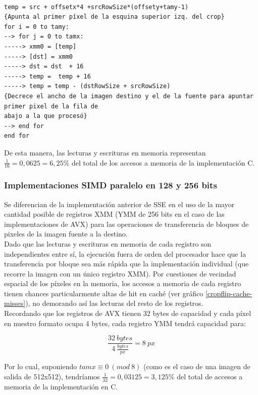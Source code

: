 \begin{codesnippet}
\begin{verbatim}

temp = src + offsetx*4 +srcRowSize*(offsety+tamy-1)       
{Apunta al primer píxel de la esquina superior izq. del crop}
for i = 0 to tamy:  
--> for j = 0 to tamx:  
-----> xmm0 = [temp]
-----> [dst] = xmm0 
-----> dst = dst  + 16 
-----> temp =  temp + 16 
-----> temp = temp - (dstRowSize + srcRowSize)       
{Decrece el ancho de la imagen destino y el de la fuente para apuntar primer pixel de la fila de
abajo a la que procesó}    
--> end for 
end for 

\end{verbatim}
\end{codesnippet}



De esta manera, las lecturas y escrituras en memoria representan $\frac{1}{16} = 0,0625 =  6,25\%$ del total de los accesos a memoria de la implementación C.


\subsubsection{Implementaciones SIMD paralelo en 128 y 256 bits}
Se diferencian de la implementación anterior de SSE en el uso de la mayor cantidad posible de registros XMM (YMM de 256 bits en el caso de las implementaciones de AVX) para las operaciones de transferencia de bloques de pixeles de la imagen fuente a la destino. 
\\

Dado que las lecturas y escrituras en memoria de cada registro son independientes entre sí, la ejecución fuera de orden del procesador hace que la transferencia por bloque sea más rápida que la implementación individual (que recorre la imagen con un único registro XMM). Por cuestiones de vecindad espacial de los píxeles en la memoria, los accesos a memoria de cada registro tienen chances particularmente altas de hit en caché (ver gráfico \ref{cropflip-cache-misses}), no demorando así las lecturas del resto de los registros.
\\

Recordando que los registros de AVX tienen 32 bytes de capacidad y cada píxel en nuestro formato ocupa 4 bytes, cada registro YMM tendrá capacidad para:

$$ \frac{32 \ bytes}{4 \ \frac{bytes}{px}} = 8 \ px $$

Por lo cual, suponiendo $ tamx \equiv 0 \ (mod \ 8) $ (como es el caso de una imagen de salida de 512x512), tendríamos $\frac{1}{32} = 0,03125 =  3,125\%$ del total de accesos a memoria de la implementación en C.


